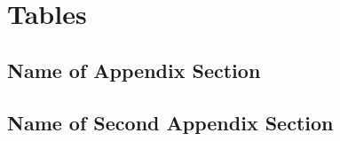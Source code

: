\chapter[Tables]{Tables} \label{app:app1}
\pagestyle{myheadings}

\kant[9]  %

\section{Name of Appendix Section}\label{table_beta_stack}

\kant[10]  %

\section{Name of Second Appendix Section}\label{table_mass_stack}

\kant[11]  %

\begin{table*}
	\caption[Positions in League]{Positions in League after 12 matches during Summer Season}\label{tab:positions}
	\centering
\end{table*}




